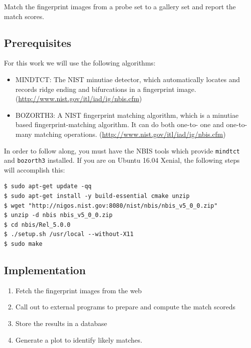 Match the fingerprint images from a probe set to a gallery set and
report the match scores.

\subsection{Prerequisites}\label{prerequisites}

For this work we will use the following algorithms:

\begin{itemize}
\tightlist
\item
  MINDTCT: The NIST minutiae detector, which automatically locates and
  records ridge ending and bifurcations in a fingerprint image.
  (\url{http://www.nist.gov/itl/iad/ig/nbis.cfm})
\item
  BOZORTH3: A NIST fingerprint matching algorithm, which is a minutiae
  based fingerprint-matching algorithm. It can do both one-to- one and
  one-to- many matching operations.
  (\url{http://www.nist.gov/itl/iad/ig/nbis.cfm})
\end{itemize}

In order to follow along, you must have the NBIS tools which provide
\texttt{mindtct} and \texttt{bozorth3} installed. If you are on Ubuntu
16.04 Xenial, the following steps will accomplish this:

\begin{lstlisting}
$ sudo apt-get update -qq
$ sudo apt-get install -y build-essential cmake unzip
$ wget "http://nigos.nist.gov:8080/nist/nbis/nbis_v5_0_0.zip"
$ unzip -d nbis nbis_v5_0_0.zip
$ cd nbis/Rel_5.0.0
$ ./setup.sh /usr/local --without-X11
$ sudo make
\end{lstlisting}

\subsection{Implementation}\label{implementation}

\begin{enumerate}
\def\labelenumi{\arabic{enumi}.}
\tightlist
\item
  Fetch the fingerprint images from the web
\item
  Call out to external programs to prepare and compute the match scoreds
\item
  Store the results in a database
\item
  Generate a plot to identify likely matches.
\end{enumerate}

